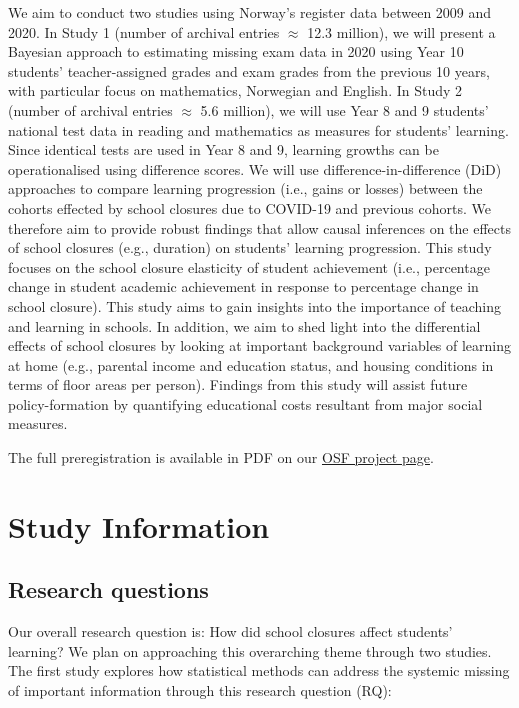 We aim to conduct two studies using Norway's register data between 2009 and 2020. In Study 1 (number of archival entries $\approx$ 12.3 million), we will present a Bayesian approach to estimating missing exam data in 2020 using Year 10 students' teacher-assigned grades and exam grades from the previous 10 years, with particular focus on mathematics, Norwegian and English. In Study 2 (number of archival entries $\approx$ 5.6 million), we will use Year 8 and 9 students' national test data in reading and mathematics as measures for students' learning. Since identical tests are used in Year 8 and 9, learning growths can be operationalised using difference scores. We will use difference-in-difference (DiD) approaches to compare learning progression (i.e., gains or losses) between the cohorts effected by school closures due to COVID-19 and previous cohorts. We therefore aim to provide robust findings that allow causal inferences on the effects of school closures (e.g., duration) on students' learning progression. This study focuses on the school closure elasticity of student achievement (i.e., percentage change in student academic achievement in response to percentage change in school closure). This study aims to gain insights into the importance of teaching and learning in schools. In addition, we aim to shed light into the differential effects of school closures by looking at important background variables of learning at home (e.g., parental income and education status, and housing conditions in terms of floor areas per person). Findings from this study will assist future policy-formation by quantifying educational costs resultant from major social measures.

The full preregistration is available in PDF on our \href{https://osf.io/t6myh/?view_only=85ac0580daf54c44979de1b9ffe0c011}{OSF project page}.

\section{Study Information}

\subsection{Research questions}
Our overall research question is: How did school closures affect students' learning? We plan on approaching this overarching theme through two studies. The first study explores how statistical methods can address the systemic missing of important information through this research question (RQ):

